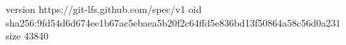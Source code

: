 version https://git-lfs.github.com/spec/v1
oid sha256:9fd54d6d674ee1b67ac5ebaea5b20f2c64ffd5e836bd13f50864a58c56d0a231
size 43840
